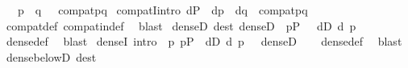 \begin{isabellebody}
\ \ \ {\isachardoublequoteopen}p\ {\isasymbottom}\ q\ {\isasymequiv}\ {\isasymnot}\ compat{\isacharparenleft}{\kern0pt}p{\isacharcomma}{\kern0pt}q{\isacharparenright}{\kern0pt}{\isachardoublequoteclose}\isanewline
\isanewline
{}\isamarkupfalse%
\ compatI{\isacharbrackleft}{\kern0pt}intro{\isacharbang}{\kern0pt}{\isacharbrackright}{\kern0pt}{\isacharcolon}{\kern0pt}\ {\isachardoublequoteopen}d{\isasymin}P\ {\isasymLongrightarrow}\ d{\isasympreceq}p\ {\isasymLongrightarrow}\ d{\isasympreceq}q\ {\isasymLongrightarrow}\ compat{\isacharparenleft}{\kern0pt}p{\isacharcomma}{\kern0pt}q{\isacharparenright}{\kern0pt}{\isachardoublequoteclose}\isanewline
%
\isadelimproof
\ \ %
\endisadelimproof
%
\isatagproof
{}\isamarkupfalse%
\ compat{\isacharunderscore}{\kern0pt}def\ compat{\isacharunderscore}{\kern0pt}in{\isacharunderscore}{\kern0pt}def\ \isamarkupfalse%
\ blast%
\endisatagproof
{\isafoldproof}%
%
\isadelimproof
\isanewline
%
\endisadelimproof
\isanewline
{}\isamarkupfalse%
\ denseD\ {\isacharbrackleft}{\kern0pt}dest{\isacharbrackright}{\kern0pt}{\isacharcolon}{\kern0pt}\ {\isachardoublequoteopen}dense{\isacharparenleft}{\kern0pt}D{\isacharparenright}{\kern0pt}\ {\isasymLongrightarrow}\ p{\isasymin}P\ {\isasymLongrightarrow}\ \ {\isasymexists}d{\isasymin}D{\isachardot}{\kern0pt}\ d{\isasympreceq}\ p{\isachardoublequoteclose}\isanewline
%
\isadelimproof
\ \ %
\endisadelimproof
%
\isatagproof
{}\isamarkupfalse%
\ dense{\isacharunderscore}{\kern0pt}def\ \isamarkupfalse%
\ blast%
\endisatagproof
{\isafoldproof}%
%
\isadelimproof
\isanewline
%
\endisadelimproof
\isanewline
{}\isamarkupfalse%
\ denseI\ {\isacharbrackleft}{\kern0pt}intro{\isacharbang}{\kern0pt}{\isacharbrackright}{\kern0pt}{\isacharcolon}{\kern0pt}\ {\isachardoublequoteopen}{\isasymlbrakk}\ {\isasymAnd}p{\isachardot}{\kern0pt}\ p{\isasymin}P\ {\isasymLongrightarrow}\ {\isasymexists}d{\isasymin}D{\isachardot}{\kern0pt}\ d{\isasympreceq}\ p\ {\isasymrbrakk}\ {\isasymLongrightarrow}\ dense{\isacharparenleft}{\kern0pt}D{\isacharparenright}{\kern0pt}{\isachardoublequoteclose}\isanewline
%
\isadelimproof
\ \ %
\endisadelimproof
%
\isatagproof
{}\isamarkupfalse%
\ dense{\isacharunderscore}{\kern0pt}def\ \isamarkupfalse%
\ blast%
\endisatagproof
{\isafoldproof}%
%
\isadelimproof
\isanewline
%
\endisadelimproof
\isanewline
{}\isamarkupfalse%
\ dense{\isacharunderscore}{\kern0pt}belowD\ {\isacharbrackleft}{\kern0pt}dest{\isacharbrackright}{\kern0pt}{\isacharcolon}{\kern0pt}\isanewline

\end{isabellebody}
